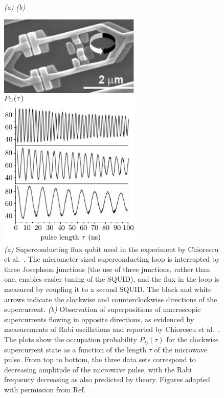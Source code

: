 \documentclass[3p,sort&compress]{elsarticle}
\begin{document}
\begin{figure}
{\footnotesize \hspace{1cm} \emph{(a)} \hspace{7.5cm} \emph{(b)} }

\centering
\begin{minipage}[c]{0.45\linewidth}
\centering
\vspace{0pt}
\includegraphics[width=0.6\textwidth]{chiosetup.pdf}
\end{minipage}
\hspace{0.5cm}
\begin{minipage}[c]{0.5\linewidth}
\vspace{0pt}
\centering
\includegraphics[width=0.6\textwidth]{chiorescu1.pdf}
\end{minipage}
\caption{\emph{(a)} Superconducting flux qubit used in the experiment by
  Chiorescu et al.\ \cite{Chiorescu:2003:ta}. The micrometer-sized superconducting loop is interrupted by three Josephson junctions (the use of three junctions, rather than one, enables easier tuning of the SQUID), and the flux in the loop is measured by coupling it to a second SQUID. The black and white arrows indicate the clockwise and counterclockwise directions of the supercurrent. \emph{(b)} Observation of superpositions of macroscopic supercurrents flowing in  opposite directions, as evidenced by measurements of Rabi oscillations and reported by Chiorescu et al.\ \cite{Chiorescu:2003:ta}. The plots show the occupation probability $P_\circlearrowright(\tau)$ for the clockwise supercurrent state as a function of the length $\tau$ of the microwave pulse. From top to bottom, the three data sets correspond to decreasing amplitude of the microwave pulse, with the Rabi frequency decreasing as also predicted by theory.  Figures adapted with permission from Ref.~\cite{Chiorescu:2003:ta}.}
\label{fig:chio}
\end{figure}
\end{document}
